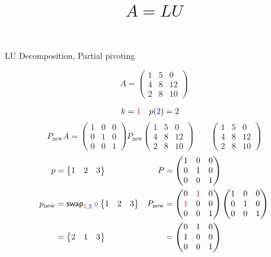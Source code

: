 \documentclass[pdf]{beamer}
\title{$A=LU$}
\subtitle{}
\author{}
\begin{document}
\begin{frame}{}
\begin{center}LU Decomposition, Partial pivoting\end{center} $$A = \begin{pmatrix}1&5&0\\4&8&12\\2&8&10\end{pmatrix}$$\end{frame}
\begin{frame}{}\begin{align*} k &= {\color{red}1} & p({\color{blue}2}) &= 2\end{align*} $$P_{\text{new}}A=\begin{pmatrix}1&0&0\\0&1&0\\0&0&1\end{pmatrix} P_{\text{new}} \begin{pmatrix}1&5&0\\\boxed{4}&8&12\\2&8&10\end{pmatrix} \quad\quad \begin{pmatrix}1&5&0\\4&8&12\\2&8&10\end{pmatrix}$$ \begin{align*} p&= \begin{Bmatrix}1&2&3\end{Bmatrix} & P&= \begin{pmatrix}1&0&0\\0&1&0\\0&0&1\end{pmatrix}\\ p_{\text{new}} &= \mathsf{swap}_{{\color{red}1},{\color{blue}2}} \circ \begin{Bmatrix}1&2&3\end{Bmatrix} & P_{\text{new}} &= \begin{pmatrix}0&{\color{purple}1}&0\\{\color{purple}1}&0&0\\0&0&1\end{pmatrix} \begin{pmatrix}1&0&0\\0&1&0\\0&0&1\end{pmatrix}\\ &=\begin{Bmatrix}2&1&3\end{Bmatrix} &&=\begin{pmatrix}0&1&0\\1&0&0\\0&0&1\end{pmatrix}\end{align*}\end{frame}
\end{document}
